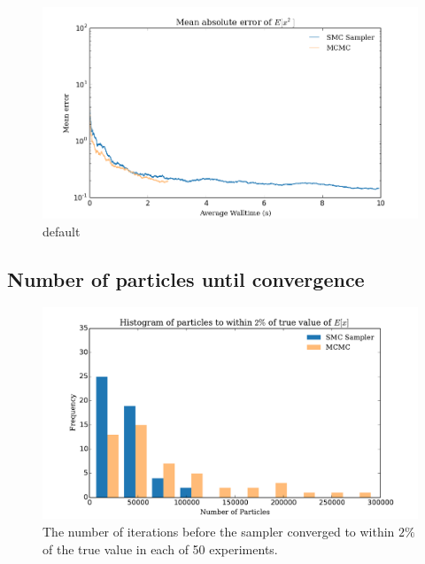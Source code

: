 \documentclass[12pt]{elsarticle}
\begin{document}
\begin{figure}[htbp]
\begin{center}
\includegraphics[width = \textwidth]{plots/E_X2_walltime.png}
\caption{default}
\label{default}
\end{center}
\end{figure}

\subsection*{Number of particles until convergence }

\begin{figure}[htbp]
\begin{center}
\includegraphics[width = \textwidth]{plots/iterations.pdf}
\caption{The number of iterations before the sampler converged to within $2\%$ of the true value in each of 50 experiments.}
\label{fig:itersEX}
\end{center}
\end{figure}
\end{document}

